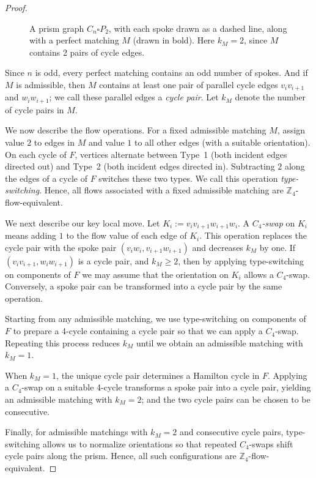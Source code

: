 \documentclass[a4paper,12pt]{article}
\theoremstyle{plain}
\theoremstyle{definition}
\renewcommand\ge\geqslant
\begin{document}
\begin{proof}
\begin{figure}[!h]
	\captionsetup{width=.625\textwidth}
	\caption{A prism graph $C_n\square P_2$, with each spoke drawn as a dashed line, along with a perfect matching $M$ (drawn in bold). Here $k_M=2$, since $M$ contains 2 pairs of cycle edges.}
\end{figure}


Since $n$ is odd, every perfect matching contains an odd number of spokes. And if $M$ is admissible,
then $M$ contains at least one pair of parallel cycle edges $v_iv_{i+1}$ and $w_iw_{i+1}$; we call these parallel edges a \emph{cycle pair}. Let $k_M$ denote the number of cycle pairs in $M$.

We now describe the flow operations. For a fixed admissible matching $M$, assign value $2$ to edges in $M$ and value $1$ to all other edges (with a suitable orientation). On each cycle of $F$, vertices alternate between Type~1 (both incident edges directed out) and Type~2 (both incident edges directed in). Subtracting $2$ along the edges of a cycle of $F$ switches these two types. We call this operation \emph{type-switching}. Hence, all flows associated with a fixed admissible matching are $\mathbb Z_4$-flow-equivalent.

We next describe our key local move. Let $K_i:=v_iv_{i+1}w_{i+1}w_i$. 
A \emph{$C_4$-swap} on $K_i$ means adding $1$ to the flow value of each edge of $K_i$.  
This operation replaces the cycle pair with 
the spoke pair $(v_iw_i, v_{i+1}w_{i+1})$ and decreases $k_M$ by one. 
If $(v_iv_{i+1}, w_iw_{i+1})$ is a cycle pair, and $k_M\ge 2$, then by applying type-switching on components of $F$ we may assume that the orientation on $K_i$ allows a $C_4$-swap. 
Conversely, a spoke pair can be transformed into a cycle pair by the same operation.

Starting from any admissible matching, we use type-switching on components of $F$ to prepare a 4-cycle containing a cycle pair so that we can apply a $C_4$-swap. Repeating this process reduces $k_M$ until we obtain an admissible matching with $k_M=1$.

When $k_M=1$, the unique cycle pair determines a Hamilton cycle in $F$. Applying a $C_4$-swap on a suitable 4-cycle transforms a spoke pair into a cycle pair, yielding an admissible matching with $k_M=2$; and the two cycle pairs can be chosen to be consecutive.

Finally, for admissible matchings with $k_M=2$ and consecutive cycle pairs, type-switching allows us to normalize orientations so that repeated $C_4$-swaps shift cycle pairs along the prism. Hence, all such configurations are $\mathbb Z_4$-flow-equivalent.
\end{proof}
\end{document}
